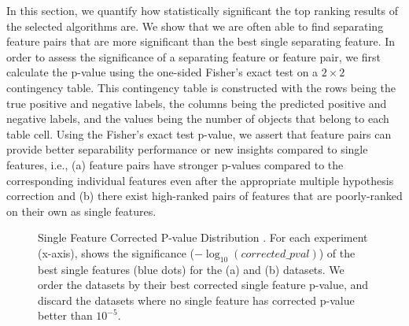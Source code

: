 In this section, we quantify how statistically significant the top ranking results of the selected algorithms are. We show that we are often able to find separating feature pairs that are more significant than the best single separating feature. In order to assess the significance of a separating feature or feature pair, we first calculate the p-value using the one-sided Fisher's exact test on a $2\times2$ contingency table. This contingency table is constructed with the rows being the true positive and negative labels, the columns being the predicted positive and negative labels, and the values being the number of objects that belong to each table cell. Using the Fisher's exact test p-value, we assert that feature pairs can provide better separability performance or new insights compared to single features, i.e., (a) feature pairs have stronger p-values compared to the corresponding individual features even after the appropriate multiple hypothesis correction and (b) there exist high-ranked pairs of features that are poorly-ranked on their own as single features.

\begin{figure}[h]
\centering %
\vspace{-5mm}
\vspace{-5mm}
\caption{Single Feature Corrected P-value Distribution . For each experiment (x-axis), shows the significance ($-\log_{10} (corrected\_pval)$) of the \tophundred best single features (blue dots) for the (a) \msig and (b) \lincs datasets. We order the datasets by their best corrected single feature p-value, and discard the datasets where no single feature has corrected p-value better than $10^{-5}$.}
\vspace{-5mm}
\label{fig:singleF}
\end{figure}


